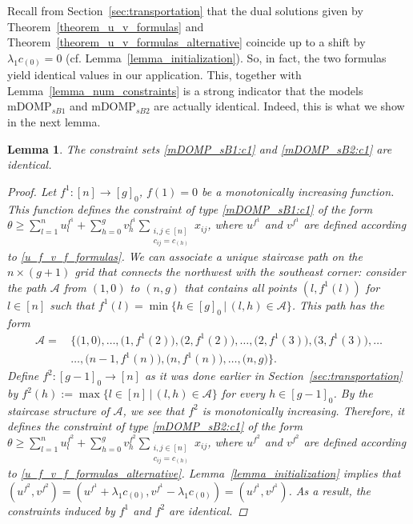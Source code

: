 \documentclass[letterpaper]{article}
\newtheorem{lemma}[theorem]{Lemma}
\begin{document}
Recall from Section~\ref{sec:transportation} that the dual solutions given by Theorem~\ref{theorem_u_v_formulas} and Theorem~\ref{theorem_u_v_formulas_alternative} coincide up to a shift by $\lambda_1 c_{(0)} = 0$ (cf. Lemma~\ref{lemma_initialization}). So, in fact, the two formulas yield identical values in our application. This, together with Lemma~\ref{lemma_num_constraints} is a strong indicator that the models $\text{mDOMP}_{sB1}$ and $\text{mDOMP}_{sB2}$ are actually identical. Indeed, this is what we show in the next lemma.
\begin{lemma}
    The constraint sets \eqref{mDOMP_sB1:c1} and \eqref{mDOMP_sB2:c1} are identical.
    \begin{proof}
        Let $f^1: [n] \rightarrow [g]_0$, $f(1) = 0$ be a monotonically increasing function. This function defines the constraint of type \eqref{mDOMP_sB1:c1} of the form $\theta \geq \sum_{l = 1}^n u_l^{f^1} + \sum_{h = 0}^g v_h^{f^1} \sum_{\substack{i,j \in [n] \\ c_{ij} = c_{(h)}}} x_{ij}$, where $u^{f^1}$ and $v^{f^1}$ are defined according to \eqref{u_f_v_f_formulas}. We can associate a unique staircase path on the $n \times (g+1)$ grid that connects the northwest with the southeast corner: consider the path $\mathcal{A}$ from $(1, 0)$ to $(n, g)$ that contains all points $(l, f^1(l))$ for $l \in [n]$ such that $f^1(l) = \min\{h \in [g]_0 \, | \, (l,h) \in \mathcal{A} \}$. This path has the form
        \begin{align*}
            \mathcal{A} = \, &\big\{\big(1,0\big), \dots, \big(1, f^1(2)\big), \big(2, f^1(2)\big), \dots, \big(2, f^1(3)\big), \big(3, f^1(3)\big), \dots \\
            & \dots, \big(n-1, f^1(n)\big), \big(n, f^1(n)\big), \dots, \big(n, g\big)\big\}.
        \end{align*}
        Define $f^2:[g-1]_0 \rightarrow [n]$ as it was done earlier in Section~\ref{sec:transportation} by $f^2(h) := \max \{l \in [n] \, | \, (l,h) \in \mathcal{A}\}$ for every $h \in [g-1]_0$. By the staircase structure of $\mathcal{A}$, we see that $f^2$ is monotonically increasing. Therefore, it defines the constraint of type \eqref{mDOMP_sB2:c1} of the form $\theta \geq \sum_{l = 1}^n u_l^{f^2} + \sum_{h = 0}^g v_h^{f^2} \sum_{\substack{i,j \in [n] \\ c_{ij} = c_{(h)}}} x_{ij}$, where $u^{f^2}$ and $v^{f^2}$ are defined according to \eqref{u_f_v_f_formulas_alternative}. Lemma~\ref{lemma_initialization} implies that $(u^{f^2}, v^{f^2}) = (u^{f^1} + \lambda_1 c_{(0)}, v^{f^1} - \lambda_1 c_{(0)}) = (u^{f^1}, v^{f^1})$. As a result, the constraints induced by $f^1$ and $f^2$ are identical.


\end{proof}
\end{lemma}
\end{document}

